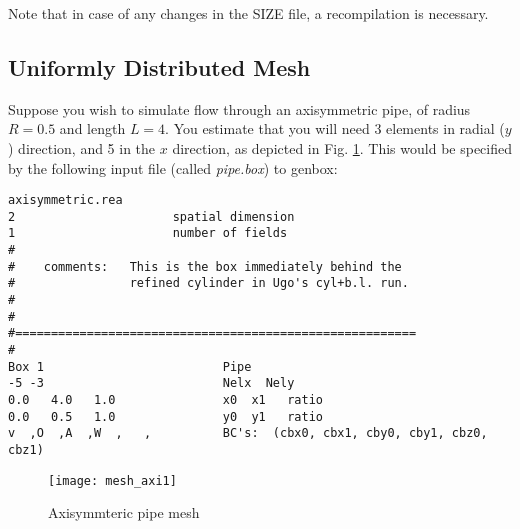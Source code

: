 
Note that in case of any changes in the SIZE file, a recompilation is necessary.\\
\subsection{Uniformly Distributed Mesh}

Suppose you wish to simulate flow through an axisymmetric pipe,
of radius \(R=0.5\) and length \(L=4\).  You estimate that you will
need 3 elements in radial (\(y\)) direction, and 5 in the \(x\) direction,
as depicted in Fig. \ref{fig:mesh_axi1}.
This would be specified by the following input file (called {\em pipe.box})
to genbox:

\begin{verbatim}
axisymmetric.rea
2                      spatial dimension
1                      number of fields
#
#    comments:   This is the box immediately behind the 
#                refined cylinder in Ugo's cyl+b.l. run.
#
#
#========================================================
#
Box 1                         Pipe
-5 -3                         Nelx  Nely
0.0   4.0   1.0               x0  x1   ratio
0.0   0.5   1.0               y0  y1   ratio
v  ,O  ,A  ,W  ,   ,          BC's:  (cbx0, cbx1, cby0, cby1, cbz0, cbz1)
\end{verbatim}
\begin{figure}
\centering
\texttt{[image: mesh\_axi1]}
\caption{Axisymmteric pipe mesh}
\label{fig:mesh_axi1}
\end{figure}
\noindent
